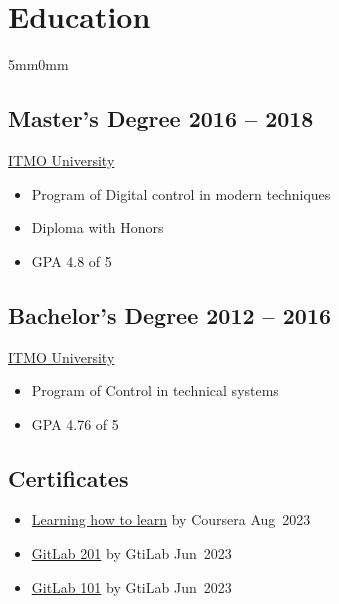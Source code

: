 \documentclass[10pt]{article}
\newcommand{\lmvalue}{5mm}
\newcommand{\rmvalue}{0mm}
\begin{document}
\section*{Education}
\begin{changemargin}{\lmvalue}{\rmvalue}

	\begin{minipage}[t]{0.47\linewidth}
		\subsection*{Master's Degree \hfill {\color{gray}2016 – 2018}}
		\href{https://en.itmo.ru/}{ITMO University}
		\begin{itemize}
			\item Program of Digital control in modern techniques
			\item Diploma with Honors
			\item GPA 4.8 of 5
		\end{itemize}
	\end{minipage}
	\hfill%
	\begin{minipage}[t]{0.48\linewidth}
		\subsection*{Bachelor's Degree \hfill {\color{gray}2012 – 2016}}
		\href{https://en.itmo.ru/}{ITMO University}
		\begin{itemize}
			\item Program of Control in technical systems
			\item GPA 4.76 of 5
		\end{itemize}
	\end{minipage}
	\subsection*{Certificates}
	\begin{minipage}[t]{0.47\linewidth}
		\begin{itemize}
			\item \href{https://www.coursera.org/account/accomplishments/certificate/JTS4UC77RMRH}{Learning how to learn} by Coursera {\color{gray}Aug~2023}
			\item \href{https://levelup.gitlab.com/c/rFApBMcWT66ZF-F4IPdlrQ}{GitLab 201} by GtiLab {\color{gray}Jun~2023}
			\item \href{https://levelup.gitlab.com/c/OQPvtAh7ScyFaSX04Cya0g}{GitLab 101} by GtiLab {\color{gray}Jun~2023}
		\end{itemize}
	\end{minipage}
\end{changemargin}
\end{document}

